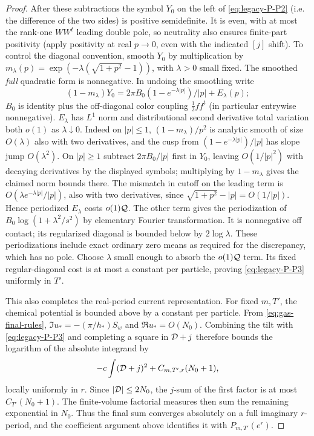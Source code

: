 \begin{proof}
After these subtractions the symbol \(Y_0\) on the left of \eqref{eq:legacy-P-P2} (i.e. the difference of the two sides) is positive semidefinite. It is even, with at most the rank-one \(WW^t\) leading double pole, so neutrality also ensures finite-part positivity (apply positivity at real \(p\to0\), even with the indicated \([j]\) shift). To control the diagonal convention, smooth \(Y_0\) by multiplication by \(m_\lambda(p)=\exp(-\lambda(\sqrt{1+p^2}-1))\), with \(\lambda>0\) small fixed. The smoothed \emph{full} quadratic form is nonnegative. In undoing the smoothing write
\[
 (1-m_\lambda)Y_0
 =2\pi B_0(1-e^{-\lambda|p|})/|p|+E_\lambda(p);
\]
\(B_0\) is identity plus the off-diagonal color coupling \(\tfrac12 ff^t\) (in particular entrywise nonnegative). \(E_\lambda\) has \(L^1\) norm and distributional second derivative total variation both \(o(1)\) as \(\lambda\downarrow0\). Indeed on \(|p|\le1\), \((1-m_\lambda)/p^2\) is analytic smooth of size \(O(\lambda)\) also with two derivatives, and the cusp from \((1-e^{-\lambda|p|})/|p|\) has slope jump \(O(\lambda^2)\). On \(|p|\ge1\) subtract \(2\pi B_0/|p|\) first in \(Y_0\), leaving \(O(1/|p|^2)\) with decaying derivatives by the displayed symbols; multiplying by \(1-m_\lambda\) gives the claimed norm bounds there. The mismatch in cutoff on the leading term is \(O(\lambda e^{-\lambda |p|}/|p|)\), also with two derivatives, since \(\sqrt{1+p^2}-|p|=O(1/|p|)\). Hence periodized \(E_\lambda\) costs \(o(1){\cal Q}\). The other term gives the periodization of \(B_0\log(1+\lambda^2/s^2)\) by elementary Fourier transformation. It is nonnegative off contact; its regularized diagonal is bounded below by \(2\log\lambda\). These periodizations include exact ordinary zero means as required for the discrepancy, which has no pole. Choose \(\lambda\) small enough to absorb the \(o(1){\cal Q}\) term. Its fixed regular-diagonal cost is at most a constant per particle, proving \eqref{eq:legacy-P-P3} uniformly in \(T'\).

This also completes the real-period current representation. For fixed
\(m,T'\), the chemical potential is bounded above by a constant per
particle. From \eqref{eq:gas-final-rules},
\(\Im u_*=-(\pi/h_*)S_w\) and \(\Re u_*=O(N_0)\).
Combining the tilt with \eqref{eq:legacy-P-P3} and completing a square
in \({\cal D}+j\) therefore bounds the logarithm of the absolute
integrand by
\[
 -c\int({\cal D}+j)^2+C_{m,T',r}(N_0+1),
\]
locally uniformly in \(r\). Since \(|{\cal D}|\le2N_0\), the
\(j\)-sum of the first factor is at most \(C_{T'}(N_0+1)\).
The finite-volume factorial measures then sum the remaining exponential
in \(N_0\). Thus the final sum converges absolutely on a full imaginary
\(r\)-period, and the coefficient argument above identifies it with
\(P_{m,T'}(e^r)\).


\end{proof}
